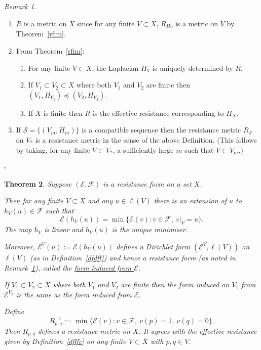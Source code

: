 \documentclass[a4paper]{amsart}
\theoremstyle{plain}
\newtheorem{theorem}{Theorem}[section]
\theoremstyle{definition}
\theoremstyle{remark}
\newtheorem{remark}[theorem]{Remark}
\begin{document}
\begin{remark}\label{remrf}
\mbox{}
\begin{enumerate}
\item $ R $ is a metric on $ X $ since for any finite $ V \subset X $, $ R_{H_V} $ is a metric on $ V $ by Theorem~\ref{rfim}. 
\item From Theorem~\ref{rfim}:
\begin{enumerate}
\item For any finite $ V\subset X $, the Laplacian $ H_V $ is uniquely determined by $ R $. 
\item If  $ V_1 \subset V_2 \subset X $ where both $ V_1 $ and $ V_2 $ are finite then  $  (V_1,H_{V_1}) \preccurlyeq (V_2,H_{V_2} ) $.
\item If $ X $ is finite then $ R $ is the effective resistance corresponding to $ H_X $. 
\end{enumerate} 
\item If  $ \mathcal{S} = \{(V_m,H_m)\} $ is a compatible sequence then   the resistance metric $ R_ { \mathcal{S} } $ on $ V_* $ is a resistance metric in the   sense of the above Definition.  (This follows by taking, for any finite $ V \subset   V_* $, a sufficiently large $ m $ such that $ V\subset V_m $.)
\end{enumerate} 
\hfill $\square$  \end{remark} 

\begin{theorem} \label{rtrp1} Suppose $ ( \mathcal{E} , \mathcal{F} ) $ is a resistance form on a set $ X $.  

Then for any finite $ V \subset X $ and any $ u \in \ell (V) $ there is an extension of $ u $ to $ h_V(u) \in \mathcal{F} $ such that
\begin{equation} \label{humin}
\mathcal{E} (h_V(u)) = \min \{ \mathcal{E} (v) :  v\in \mathcal{F} ,\ v|_V = u \}. 
\end{equation} 
The map $ h_V $ is linear and  $h_V(u) $ is the unique minimiser. 

Moreover, $ \mathcal{E} ^V (u) := \mathcal{E} ( h_V (u)) $ defines a Dirichlet form $ (\mathcal{E}  ^V, \ell(V)) $ on $ \ell(V) $ (as in Definition~\ref{dfdff}) and hence a resistance form (as noted in Remark~\ref{remrf}), called the \underline{form induced from $  \mathcal{E}  $}.

If $ V_1 \subset V_2 \subset X $ where both $ V_1 $ and $ V_2 $ are finite then the form induced on $ V_1 $ from $  \mathcal{E}  ^{V_2} $   is the same as the form induced from $ \mathcal{E} $.  

Define
\begin{equation} \label{}
R_{p,q}^{-1} := \min \{ \mathcal{E} (v) :  v\in \mathcal{F} ,\ v(p) =1, \ v(q)=0  \} .
\end{equation} 
Then $ R_{p,q} $ defines a resistance metric on $ X $.  It agrees with the effective resistance given by Definition~\ref{dflfc}  on any finite $ V\subset X $ with $ p,q \in V $.
\end{theorem}   
\end{document}
